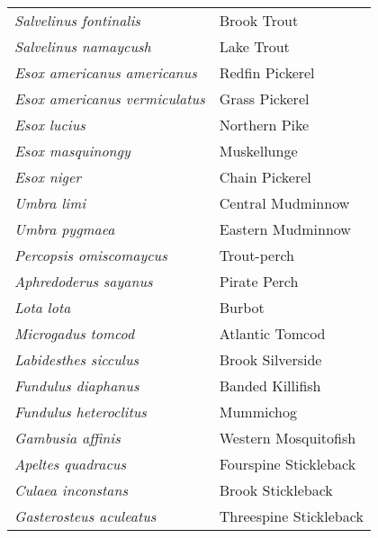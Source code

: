\documentclass[11pt]{article}
\begin{document}
\vspace{\baselineskip}

%
\textbf{\Student}

\begin{tabular}{@{}L{3in}L{3in}@{}}
\textit{Salvelinus fontinalis} & Brook Trout\tabularnewline
\textit{Salvelinus namaycush} & Lake Trout\tabularnewline
\textit{Esox americanus americanus} & Redfin Pickerel\tabularnewline
\textit{Esox americanus vermiculatus} & Grass Pickerel\tabularnewline
\textit{Esox lucius} & Northern Pike\tabularnewline
\textit{Esox masquinongy} & Muskellunge\tabularnewline
\textit{Esox niger} & Chain Pickerel\tabularnewline
\textit{Umbra limi} & Central Mudminnow\tabularnewline
\textit{Umbra pygmaea} & Eastern Mudminnow\tabularnewline
\textit{Percopsis omiscomaycus}	& Trout-perch\tabularnewline
\textit{Aphredoderus sayanus} & Pirate Perch\tabularnewline
\textit{Lota lota} & Burbot\tabularnewline
\textit{Microgadus tomcod} & Atlantic Tomcod\tabularnewline
\textit{Labidesthes sicculus} & Brook Silverside\tabularnewline
\textit{Fundulus diaphanus} & Banded Killifish\tabularnewline
\textit{Fundulus heteroclitus} & Mummichog\tabularnewline
\textit{Gambusia affinis} & Western Mosquitofish\tabularnewline
\textit{Apeltes quadracus} & Fourspine Stickleback\tabularnewline
\textit{Culaea inconstans} & Brook Stickleback\tabularnewline
\textit{Gasterosteus aculeatus} & Threespine Stickleback\tabularnewline
\end{tabular}

\newpage
\end{document}
